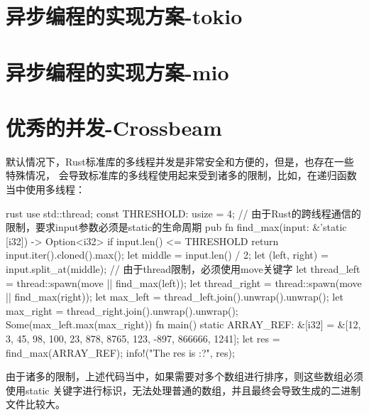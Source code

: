\section{异步编程的实现方案-tokio}
\section{异步编程的实现方案-mio}

\section{优秀的并发-Crossbeam}
默认情况下，Rust标准库的多线程并发是非常安全和方便的，但是，也存在一些特殊情况，
会导致标准库的多线程使用起来受到诸多的限制，比如，在递归函数当中使用多线程：
\begin{code-block}{rust}
use std::thread;
const THRESHOLD: usize = 4;
// 由于Rust的跨线程通信的限制，要求input参数必须是static的生命周期
pub fn find_max(input: &'static [i32]) -> Option<i32> {
    if input.len() <= THRESHOLD {
        return input.iter().cloned().max();
    }
    let middle = input.len() / 2;
    let (left, right) = input.split_at(middle);
    // 由于thread限制，必须使用move关键字
    let thread_left = thread::spawn(move || find_max(left));
    let thread_right = thread::spawn(move || find_max(right));
    let max_left = thread_left.join().unwrap().unwrap();
    let max_right = thread_right.join().unwrap().unwrap();
    Some(max_left.max(max_right))
}
fn main() {
    static ARRAY_REF: &[i32] = &[12, 3, 45, 98, 100, 23, 878, 8765, 123, -897, 866666, 1241];
    let res = find_max(ARRAY_REF);
    info!("The res is {:?}", res);
}
\end{code-block}
由于诸多的限制，上述代码当中，如果需要对多个数组进行排序，则这些数组必须使用static
关键字进行标识，无法处理普通的数组，并且最终会导致生成的二进制文件比较大。

